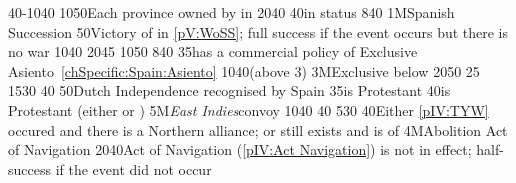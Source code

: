 {40-10}{40}{}%
%
%
{10}{50}{Each province owned by \paysmajeurEspagne in \regionBelgique}%
%
%
{20}{40}{\EU@objSpanishWorld}%
%
%
{}{40}{\paysportugal in \ANNEXION status}%
%
%
{8}{40}{\EU@objMonopolyZone}%
%
%
\EUobjective1M{Spanish Succession}{}%
{}{50}{Victory of \SPA in \ref{pV:WoSS}; full success if the event occurs but
  there is no war}%
%
%
{10}{40}{\EU@objOuterProvinces}%
%
%
{20}{45}{\EU@objSpanishWorld}%
%
%
{10}{50}{\EU@objPresidiosHIS}%
%
%
{8}{40}{\EU@objMonopolyZone}%
%
%
%
{}{35}{\paysmajeurEspagne has a commercial policy of Exclusive
  Asiento~\ref{chSpecific:Spain:Asiento}}%
%
%
{10}{40}{\EU@objOuterProvinces (above 3)}%
%
\EUobjective3M{Exclusive below }{}%
{20}{50}{\EU@objSpanishWorld}%
%
%
{}{25}{\EU@objIndustrial}%
%
%
{15}{30}{\EU@objIndependanceWars}%
%
 
%
%
{}{40}{}%
%
%
{}{50}{Dutch Independence recognised by Spain}%
%
%
{}{35}{\paysmajeurFrance is Protestant}%
%
%
{}{40}{\paysmajeurAngleterre is Protestant (either \PROTANG or \PROTPUR)}%
%
\EUobjective5M{\emph{East Indies}}{convoy}%
{10}{40}{\EU@objEastIndiesConvoy}%
%
%
%
{}{40}{}%
%
%
{5}{30}{\EU@objBaltiqueTrade}%
%
%
{}{40}{Either \ref{pIV:TYW} occured and there is a Northern \HRE alliance; or
  \payshanse still exists and is \VASSAL of \paysmajeurHollande}%
%
\EUobjective4M{Abolition Act of Navigation}{}%
{20}{40}{Act of Navigation (\ref{pIV:Act Navigation}) is not in effect;
  half-success if the event did not occur}%
